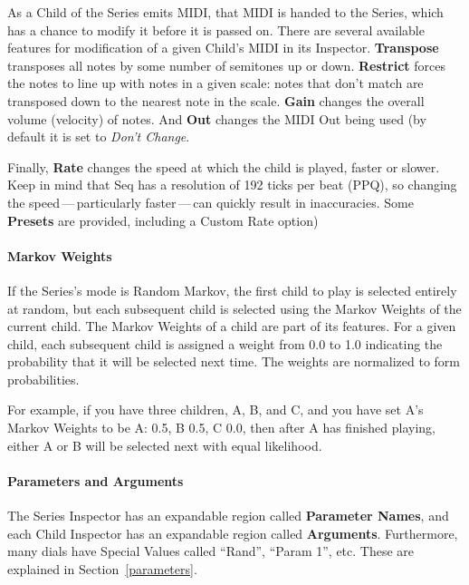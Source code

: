 \documentclass[twoside,10pt]{article}
\begin{document}
As a Child of the Series emits MIDI, that MIDI is handed to the Series, which has a chance to modify it before it is passed on.  There are several available features for modification of a given Child's MIDI in its Inspector.  {\bf Transpose} transposes all notes by some number of semitones up or down.  {\bf Restrict} forces the notes to line up with notes in a given scale: notes that don't match are transposed down to the nearest note in the scale.  {\bf Gain} changes the overall volume (velocity) of notes.  And {\bf Out} changes the MIDI Out being used (by default it is set to {\it Don't Change}.

Finally, {\bf Rate} changes the speed at which the child is played, faster or slower.  Keep in mind that Seq has a resolution of 192 ticks per beat (PPQ), so changing the speed\,---\,particularly faster\,---\,can quickly result in inaccuracies.  Some {\bf Presets} are provided, including a Custom Rate option)

\paragraph{Markov Weights}

If the Series's mode is Random Markov, the first child to play is selected entirely at random, but each subsequent child is selected using the Markov Weights of the current child.  The Markov Weights of a child are part of its features.  For a given child, each subsequent child is assigned a weight from 0.0 to 1.0 indicating the probability that it will be selected next time.  The weights are normalized to form probabilities.

For example, if you have three children, A, B, and C, and you have set A's Markov Weights to be A: 0.5, B 0.5, C 0.0, then after A has finished playing, either A or B will be selected next with equal likelihood.

\paragraph{Parameters and Arguments}

The Series Inspector has an expandable region called {\bf Parameter Names}, and each Child Inspector has an expandable region called {\bf Arguments}. Furthermore, many dials have Special Values called ``Rand'', ``Param 1'', etc.  These are explained in Section~\ref{parameters}.

\clearpage
\end{document}
